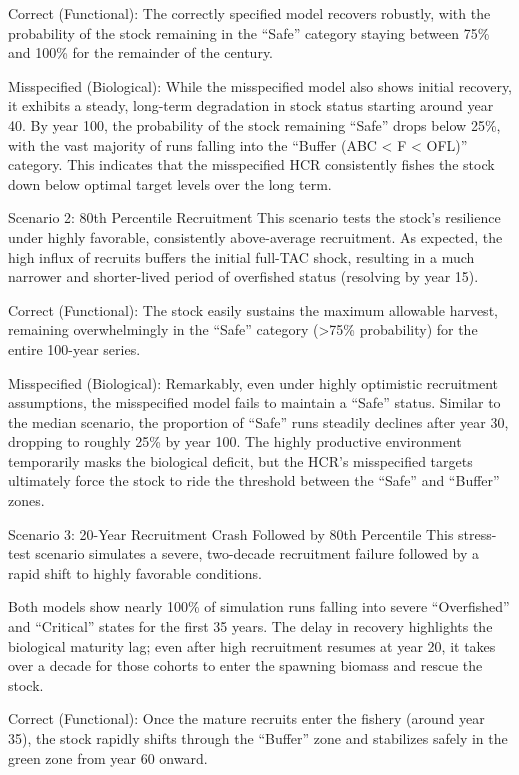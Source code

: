 \documentclass[
  authoryear,
  preprint,
  3p]{elsarticle}
\begin{document}
Correct (Functional): The correctly specified model recovers robustly,
with the probability of the stock remaining in the ``Safe'' category
staying between 75\% and 100\% for the remainder of the century.

Misspecified (Biological): While the misspecified model also shows
initial recovery, it exhibits a steady, long-term degradation in stock
status starting around year 40. By year 100, the probability of the
stock remaining ``Safe'' drops below 25\%, with the vast majority of
runs falling into the ``Buffer (ABC \textless{} F \textless{} OFL)''
category. This indicates that the misspecified HCR consistently fishes
the stock down below optimal target levels over the long term.

Scenario 2: 80th Percentile Recruitment This scenario tests the stock's
resilience under highly favorable, consistently above-average
recruitment. As expected, the high influx of recruits buffers the
initial full-TAC shock, resulting in a much narrower and shorter-lived
period of overfished status (resolving by year 15).

Correct (Functional): The stock easily sustains the maximum allowable
harvest, remaining overwhelmingly in the ``Safe'' category
(\textgreater75\% probability) for the entire 100-year series.

Misspecified (Biological): Remarkably, even under highly optimistic
recruitment assumptions, the misspecified model fails to maintain a
``Safe'' status. Similar to the median scenario, the proportion of
``Safe'' runs steadily declines after year 30, dropping to roughly 25\%
by year 100. The highly productive environment temporarily masks the
biological deficit, but the HCR's misspecified targets ultimately force
the stock to ride the threshold between the ``Safe'' and ``Buffer''
zones.

Scenario 3: 20-Year Recruitment Crash Followed by 80th Percentile This
stress-test scenario simulates a severe, two-decade recruitment failure
followed by a rapid shift to highly favorable conditions.

Both models show nearly 100\% of simulation runs falling into severe
``Overfished'' and ``Critical'' states for the first 35 years. The delay
in recovery highlights the biological maturity lag; even after high
recruitment resumes at year 20, it takes over a decade for those cohorts
to enter the spawning biomass and rescue the stock.

Correct (Functional): Once the mature recruits enter the fishery (around
year 35), the stock rapidly shifts through the ``Buffer'' zone and
stabilizes safely in the green zone from year 60 onward.
\end{document}
